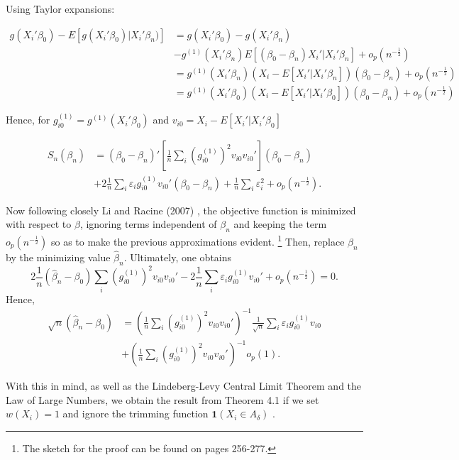 Using Taylor expansions:

\begin{align*}
g(X_i'\beta_0) - E[g(X_i'\beta_0)|X_i'\beta_n)] & = g(X_i'\beta_0) - g(X_i'\beta_n) \\
                                             & - g^{(1)}(X_i'\beta_n)E[(\beta_0 - \beta_n)X_i'|X_i'\beta_n] + o_p(n^{-\frac{1}{2}}) \\
                                              & = g^{(1)}(X_i'\beta_n)( X_i - E[X_i'|X_i'\beta_n])(\beta_0 - \beta_n) + o_p(n^{-\frac{1}{2}}) \\
                                              & = g^{(1)}(X_i'\beta_0)( X_i - E[X_i'|X_i'\beta_0])(\beta_0 - \beta_n) + o_p(n^{-\frac{1}{2}})
\end{align*}


Hence, for $g_{i0}^{(1)} = g^{(1)}(X_i'\beta_0)$ and $v_{i0} = X_i - E[X_i'|X_i'\beta_0]$
 
\begin{align*}
S_{n}(\beta_n) & = (\beta_0 - \beta_n)'\left[\frac{1}{n}\sum_i (g_{i0}^{(1)})^2v_{i0}v_{i0}'\right](\beta_0 - \beta_n) \\
             & + 2\frac{1}{n}\sum_i\varepsilon_ig_{i0}^{(1)}v_{i0}'(\beta_0 - \beta_n) + \frac{1}{n}\sum_i \varepsilon_i^2 + o_p(n^{-\frac{1}{2}}).
\end{align*}

Now following closely Li and Racine (2007) \cite{[1]}, the objective function is minimized with respect to $\beta$, ignoring terms independent of $\beta_n$ and keeping the term $o_p(n^{-\frac{1}{2}})$ so as to make the previous approximations evident. \footnote{ The sketch for the proof can be found on pages 256-277.} Then, replace $\beta_n$ by the minimizing value $\hat{\beta}_n$. Ultimately, one obtains
\[2\frac{1}{n}(\hat{\beta}_n - \beta_0)\sum_i(g_{i0}^{(1)})^2v_{i0}v_{i0}' - 2\frac{1}{n}\sum_i\varepsilon_ig_{i0}^{(1)}v_{i0}' + o_p(n^{-\frac{1}{2}}) = 0.  \]
Hence, 
\begin{align*}
\sqrt{n}(\hat{\beta}_n - \beta_0) & = (\frac{1}{n}\sum_i(g_{i0}^{(1)})^2v_{i0}v_{i0}')^{-1}\frac{1}{\sqrt{n}}\sum_i\varepsilon_i g_{i0}^{(1)}v_{i0} \\
& + (\frac{1}{n}\sum_i(g_{i0}^{(1)})^2v_{i0}v_{i0}')^{-1}o_p(1).
\end{align*}

With this in mind, as well as the Lindeberg-Levy Central Limit Theorem and the Law of Large Numbers, we obtain the result from Theorem 4.1 if we set $w(X_i) = 1$ and ignore the trimming function $\mathbf{1}(X_i \in A_\delta)$ .


